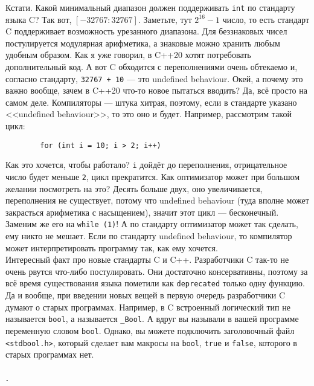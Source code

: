 \documentclass{article}
\begin{document}
    Кстати. Какой минимальный диапазон должен поддерживать \texttt{int} по стандарту языка C? Так вот, $[-32767:32767]$. Заметьте, тут $2^{16}-1$ число, то есть стандарт C поддерживает возможность урезанного диапазона. Для беззнаковых чисел постулируется модулярная арифметика, а знаковые можно хранить любым удобным образом. Как я уже говорил, в C++20 хотят потребовать дополнительный код. А вот C обходится с переполнениями очень обтекаемо и, согласно стандарту, \texttt{32767 + 10} --- это undefined behaviour. Окей, а почему это важно вообще, зачем в C++20 что-то новое пытаться вводить? Да, всё просто на самом деле. Компиляторы --- штука хитрая, поэтому, если в стандарте указано <<undefined behaviour>>, то это оно и будет. Например, рассмотрим такой цикл:
    \begin{verbatim}
        for (int i = 10; i > 2; i++)
    \end{verbatim}
    Как это хочется, чтобы работало? \texttt{i} дойдёт до переполнения, отрицательное число будет меньше \texttt{2}, цикл прекратится. Как оптимизатор может при большом желании посмотреть на это? Десять больше двух, оно увеличивается, переполнения не существует, потому что undefined behaviour (туда вполне может закрасться арифметика с насыщением), значит этот цикл --- бесконечный. Заменим же его на \texttt{while (1)}! А по стандарту оптимизатор может так сделать, ему никто не мешает. Если по стандарту undefined behaviour, то компилятор может интерпретировать программу так, как ему хочется.\\
    Интересный факт про новые стандарты C и C++. Разработчики C так-то не очень рвутся что-либо постулировать. Они достаточно консервативны, поэтому за всё время существования языка пометили как \texttt{deprecated} только одну функцию. Да и вообще, при введении новых вещей в первую очередь разработчики C думают о старых программах. Например, в C встроенный логический тип не называется \texttt{bool}, а называется \texttt{_Bool}. А вдруг вы называли в вашей программе переменную словом \texttt{bool}. Однако, вы можете подключить заголовочный файл \texttt{<stdbool.h>}, который сделает вам макросы на \texttt{bool}, \texttt{true} и \texttt{false}, которого в старых программах нет.
    \subparagraph{.}
\end{document}
